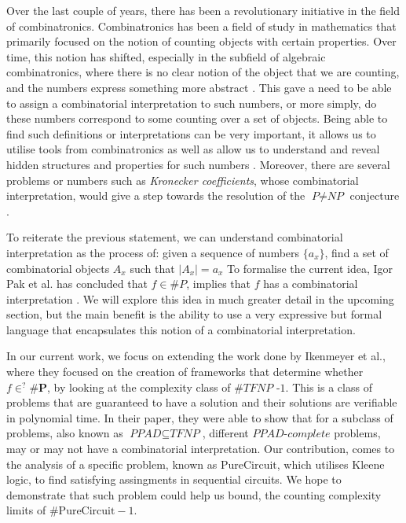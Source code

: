 Over the last couple of years, there has been a revolutionary
initiative in the field of combinatronics.
Combinatronics has been a field of study in mathematics that primarily focused on
the notion of counting objects with certain properties. Over time, this notion
has shifted, especially in the subfield of algebraic combinatronics, where
there is no clear notion of the object that we are counting,
and the numbers express something more abstract \cite{pakWhatCombinatorialInterpretation2022}. %
This gave a need to be able to assign a combinatorial interpretation to such numbers, or
more simply, do these numbers correspond to some counting over a set of objects.
Being able to find such definitions or interpretations can be very important,
it allows us to utilise tools from combinatronics as well as allow us to understand
and reveal hidden structures and properties for such numbers \cite{pakWhatCombinatorialInterpretation2022}. 
Moreover, there are several problems or numbers such as \textit{Kronecker coefficients},
whose combinatorial interpretation, would give a step towards the resolution of the $\textit{P} \neq \textit{NP}$
conjecture \cite{ikenmeyerWhatWhatNot2022a}.


To reiterate the previous statement, we can understand combinatorial interpretation as
the process of: given a sequence of numbers $\{a_x\}$,
find a set of combinatorial objects $A_x$ such that $|A_x| = a_x$
To formalise the current idea, Igor Pak et al. has concluded that
$f \in \textit{\#P}$, implies that $f$ has a combinatorial interpretation
\cite{pakWhatCombinatorialInterpretation2022, ikenmeyerWhatWhatNot2022a}.
We will explore this idea in much greater detail in the upcoming section,
but the main benefit is the ability to use a very expressive but formal language
that encapsulates this notion of a combinatorial interpretation.


In our current work, we focus on extending the work done by
Ikenmeyer et al., where they focused on the creation of frameworks
that determine whether $f \in^? \textbf{\#P}$, by looking
at the complexity class of $\textbf{\#}\textit{TFNP -1}$.
This is a class of problems that are guaranteed to have a solution
and their solutions are verifiable in polynomial time.
In their paper, they were able to show that for a subclass of
problems, also known as $\textit{PPAD} \subseteq \textit{TFNP}$,
different $\textit{PPAD-complete}$ problems, may or may not have a combinatorial
interpretation. Our contribution, comes to the analysis of a specific
problem, known as $\text{PureCircuit}$, which utilises
Kleene logic, to find satisfying assingments in sequential circuits.
We hope to demonstrate that such problem could help us bound, the
counting complexity limits of $\textbf{\#}\text{PureCircuit} -1$.

